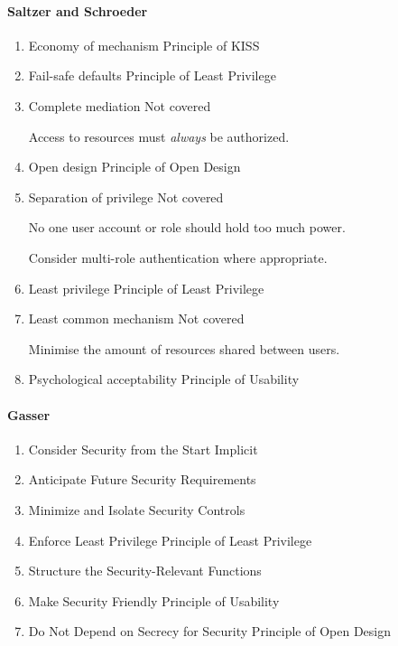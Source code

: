 \paragraph{Saltzer and Schroeder}
\begin{enumerate}
    \item Economy of mechanism \dotfill Principle of KISS
    \item Fail-safe defaults \dotfill Principle of Least Privilege
    \item Complete mediation \dotfill Not covered
    
    \hspace{0.5em} Access to resources must \textsl{always} be authorized.

    \item Open design \dotfill Principle of Open Design
    \item Separation of privilege \dotfill Not covered
    
    \hspace{0.5em} No one user account or role should hold too much power.

    \hspace{0.5em} Consider multi-role authentication where appropriate.

    \item Least privilege \dotfill Principle of Least Privilege
    \item Least common mechanism \dotfill Not covered
    
    \hspace{0.5em} Minimise the amount of resources shared between users.

    \item Psychological acceptability \dotfill Principle of Usability
\end{enumerate}

\paragraph{Gasser}
\begin{enumerate}
    \item Consider Security from the Start \dotfill Implicit
    \item Anticipate Future Security Requirements
    \item Minimize and Isolate Security Controls
    \item Enforce Least Privilege \dotfill Principle of Least Privilege
    \item Structure the Security-Relevant Functions
    \item Make Security Friendly \dotfill Principle of Usability
    \item Do Not Depend on Secrecy for Security \dotfill Principle of Open Design
\end{enumerate}

